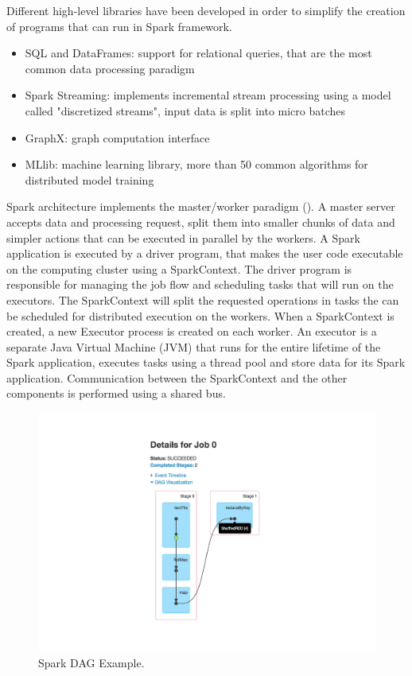 Different high-level libraries have been developed in order to simplify
the creation of programs that can run in Spark framework.
\begin{itemize}
	\item SQL and DataFrames: support for relational queries, that are the most common data processing paradigm
	\item Spark Streaming: implements incremental stream processing using a model called "discretized streams", input data is split into micro batches
	\item GraphX: graph computation interface
	\item MLlib: machine learning library, more than 50 common algorithms for distributed model training
\end{itemize}
Spark architecture implements the master/worker paradigm  (). A master server accepts data and processing request, split them into smaller chunks of data and simpler actions that can be executed 
in parallel by the workers. A Spark application is executed by a driver program, that makes the user code executable on the computing cluster using a SparkContext. The driver program is responsible for managing the job flow and scheduling tasks that will run on the executors. The SparkContext will split the requested operations in tasks the can be scheduled for distributed execution on the workers. When a SparkContext is created, a new Executor process is created on each worker. An executor is a separate Java Virtual Machine (JVM) that runs for the entire lifetime of the Spark application, executes tasks using a thread pool and store data for its Spark application. Communication between the SparkContext and the other
components is performed using a shared bus.
\begin{figure}
	\centering
	\includegraphics[width=\columnwidth]{Images/spark_dag_example.pdf}  
	\caption[Spark DAG Example]{Spark DAG Example.}
	\label{fig:sparkDAGExample}
\end{figure}
